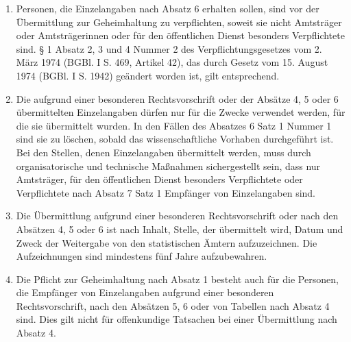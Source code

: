 \begin{enumerate}[label=(\arabic*)]
\begin{enumerate}[label=\arabic*.]
                \end{enumerate}
            \item Personen, die Einzelangaben nach Absatz 6 erhalten sollen, sind vor der Über\-mitt\-lung zur Geheimhaltung zu verpflichten, soweit sie nicht Amtsträger oder Amtsträgerinnen oder für den öffentlichen Dienst besonders Verpflichtete sind. § 1 Absatz 2, 3 und 4 Nummer 2 des Verpflichtungsgesetzes vom 2. März 1974 (BGBl. I S. 469, Artikel 42), das durch Gesetz vom 15. August 1974 (BGBl. I S. 1942) geändert worden ist, gilt entsprechend. 
            \item Die aufgrund einer besonderen Rechtsvorschrift oder der Absätze 4, 5 oder 6 übermittelten Einzelangaben dürfen nur für die Zwecke verwendet werden, für die sie übermittelt wurden. In den Fällen des Absatzes 6 Satz 1 Nummer 1 sind sie zu löschen, sobald das wissenschaftliche Vorhaben durchgeführt ist. Bei den Stellen, denen Einzelangaben übermittelt werden, muss durch organisatorische und technische Maßnahmen sichergestellt sein, dass nur Amtsträger, für den öffentlichen Dienst besonders Verpflichtete oder Verpflichtete nach Absatz 7 Satz 1 Empfänger von Einzelangaben sind.
            \item Die Übermittlung aufgrund einer besonderen Rechtsvorschrift oder nach den Ab\-sätzen 4, 5 oder 6 ist nach Inhalt, Stelle, der übermittelt wird, Datum und Zweck der Weitergabe von den statistischen Ämtern aufzuzeichnen. Die Aufzeichnungen sind mindestens fünf Jahre aufzubewahren.
            \item Die Pflicht zur Geheimhaltung nach Absatz 1 besteht auch für die Personen, die Empfänger von Einzelangaben aufgrund einer besonderen Rechtsvorschrift, nach den Absätzen 5, 6 oder von Tabellen nach Absatz 4 sind. Dies gilt nicht für offenkundige Tatsachen bei einer Übermittlung nach Absatz 4.
        \end{enumerate}
